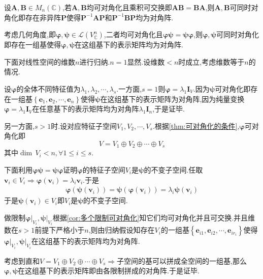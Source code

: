 \begin{green}
\begin{lemma}[同时对角化]\label{lemma:同时对角化}
    设$\bm{A},\bm{B}\in M_n\left(\mathbb{C}\right)$,若$\bm{A},\bm{B}$均可对角化且乘积可交换即$\bm{AB}=\bm{BA}$,则$\bm{A},\bm{B}$可同时对角化即存在非异阵$\bm{P}$使得$\bm{P}^{-1}\bm{AP}$和$\bm{P}^{-1}\bm{BP}$均为对角阵.
\end{lemma}
\begin{Proof}
    考虑几何角度,即$\bm{\varphi},\bm{\psi}\in\mathcal{L}\left(V_{\mathbb{C}}^n\right)$,二者均可对角化且$\bm{\varphi}\bm{\psi}=\bm{\psi}\bm{\varphi}$,则$\bm{\varphi},\bm{\psi}$可同时对角化即存在一组基使得$\bm{\varphi},\bm{\psi}$在这组基下的表示矩阵均为对角阵.

    下面对线性空间的维数$n$进行归纳.$n=1$显然.设维数$<n$时成立,考虑维数等于$n$的情况.

    设$\bm{\varphi}$的全体不同特征值为$\lambda_1,\lambda_2,\cdots,\lambda_s$.一方面,$s=1$则$\bm{\varphi}=\lambda_1\bm{I}_V$.因为$\bm{\psi}$可对角化即存在一组基$\left\{
        \bm{e}_1,\bm{e}_2,\cdots,\bm{e}_n
    \right\}$使得$\bm{\psi}$在这组基下的表示矩阵为对角阵,因为纯量变换$\bm{\varphi}=\lambda_1\bm{I}_V$在任意基下的表示矩阵均为对角阵$\lambda_1\bm{I}_n$,于是证毕.

    另一方面,$s>1$时.设对应特征子空间$V_1,V_2,\cdots,V_s$.根据\cref{thm:可对角化的条件},$\bm{\varphi}$可对角化即\[
    V=V_1\oplus V_2\oplus\cdots\oplus V_s
    \]其中$\dim\,V_i<n,\forall 1\leqslant i\leqslant s.$

    下面利用$\bm{\varphi\psi}=\bm{\psi\varphi}$证明$\bm{\varphi}$的特征子空间$V_i$是$\bm{\psi}$的不变子空间.任取$\bm{v}_i\in V_i\Longrightarrow \bm{\varphi}\left(\bm{v}_i\right)=\lambda_i\bm{v}_i.$于是\begin{align*}
        \bm{\varphi}\left(\bm{\psi}\left(\bm{v}_i\right)\right)=\bm{\psi}\left(\bm{\varphi}\left(\bm{v}_i\right)\right)=\lambda_i\bm{\psi}\left(\bm{v}_i\right)
    \end{align*}
    于是$\bm{\psi}\left(\bm{v}_i\right)\in V_i$即$V_i$是$\bm{\psi}$的不变子空间.

    做限制$\bm{\varphi}\Big|_{V_i},\bm{\psi}\Big|_{V_i}$根据\cref{cor:多个限制可对角化}知它们均可对角化并且可交换.并且维数在$s>1$前提下严格小于$n$,则由归纳假设知存在$V_i$的一组基$\left\{
        \bm{e}_{i1},\bm{e}_{i2},\cdots,\bm{e}_{ir_i}
    \right\}$使得$\bm{\varphi}\Big|_{V_i},\bm{\psi}\Big|_{V_i}$在这组基下的表示矩阵均为对角阵.

    考虑到直和$V=V_1\oplus V_2\oplus\cdots\oplus V_s\Longrightarrow$子空间的基可以拼成全空间的一组基,那么$\bm{\varphi},\bm{\psi}$在这组基下的表示矩阵即由各限制拼成的对角阵.于是证毕.
\end{Proof}
\end{green}
